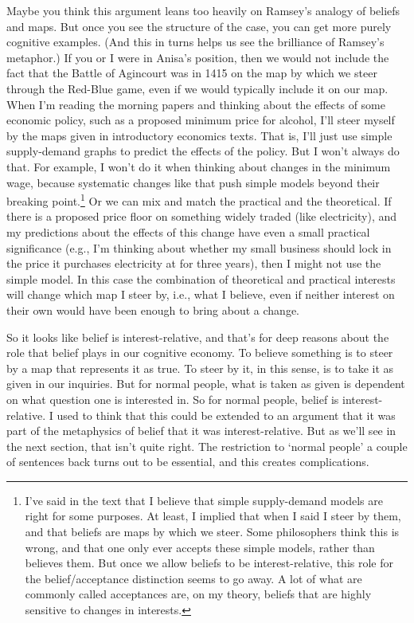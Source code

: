\documentclass[
  11pt,
]{book}
\begin{document}
Maybe you think this argument leans too heavily on Ramsey's analogy of beliefs and maps. But once you see the structure of the case, you can get more purely cognitive examples. (And this in turns helps us see the brilliance of Ramsey's metaphor.) If you or I were in Anisa's position, then we would not include the fact that the Battle of Agincourt was in 1415 on the map by which we steer through the Red-Blue game, even if we would typically include it on our map. When I'm reading the morning papers and thinking about the effects of some economic policy, such as a proposed minimum price for alcohol, I'll steer myself by the maps given in introductory economics texts. That is, I'll just use simple supply-demand graphs to predict the effects of the policy. But I won't always do that. For example, I won't do it when thinking about changes in the minimum wage, because systematic changes like that push simple models beyond their breaking point.\footnote{I've said in the text that I believe that simple supply-demand models are right for some purposes. At least, I implied that when I said I steer by them, and that beliefs are maps by which we steer. Some philosophers think this is wrong, and that one only ever accepts these simple models, rather than believes them. But once we allow beliefs to be interest-relative, this role for the belief/acceptance distinction seems to go away. A lot of what are commonly called acceptances are, on my theory, beliefs that are highly sensitive to changes in interests.} Or we can mix and match the practical and the theoretical. If there is a proposed price floor on something widely traded (like electricity), and my predictions about the effects of this change have even a small practical significance (e.g., I'm thinking about whether my small business should lock in the price it purchases electricity at for three years), then I might not use the simple model. In this case the combination of theoretical and practical interests will change which map I steer by, i.e., what I believe, even if neither interest on their own would have been enough to bring about a change.

So it looks like belief is interest-relative, and that's for deep reasons about the role that belief plays in our cognitive economy. To believe something is to steer by a map that represents it as true. To steer by it, in this sense, is to take it as given in our inquiries. But for normal people, what is taken as given is dependent on what question one is interested in. So for normal people, belief is interest-relative. I used to think that this could be extended to an argument that it was part of the metaphysics of belief that it was interest-relative. But as we'll see in the next section, that isn't quite right. The restriction to `normal people' a couple of sentences back turns out to be essential, and this creates complications.
\end{document}
